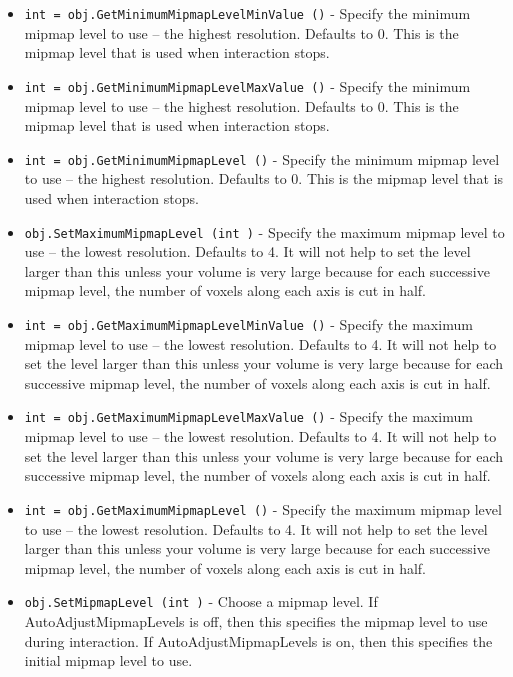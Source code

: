 \begin{itemize}
\item  \verb|int = obj.GetMinimumMipmapLevelMinValue ()| -  Specify the minimum mipmap level to use -- the highest resolution.
 Defaults to 0. This is the mipmap level that is used when interaction
 stops.

\item  \verb|int = obj.GetMinimumMipmapLevelMaxValue ()| -  Specify the minimum mipmap level to use -- the highest resolution.
 Defaults to 0. This is the mipmap level that is used when interaction
 stops.

\item  \verb|int = obj.GetMinimumMipmapLevel ()| -  Specify the minimum mipmap level to use -- the highest resolution.
 Defaults to 0. This is the mipmap level that is used when interaction
 stops.

\item  \verb|obj.SetMaximumMipmapLevel (int )| -  Specify the maximum mipmap level to use -- the lowest resolution.
 Defaults to 4. It will not help to set the level larger than
 this unless your volume is very large because for each successive mipmap
 level, the number of voxels along each axis is cut in half.

\item  \verb|int = obj.GetMaximumMipmapLevelMinValue ()| -  Specify the maximum mipmap level to use -- the lowest resolution.
 Defaults to 4. It will not help to set the level larger than
 this unless your volume is very large because for each successive mipmap
 level, the number of voxels along each axis is cut in half.

\item  \verb|int = obj.GetMaximumMipmapLevelMaxValue ()| -  Specify the maximum mipmap level to use -- the lowest resolution.
 Defaults to 4. It will not help to set the level larger than
 this unless your volume is very large because for each successive mipmap
 level, the number of voxels along each axis is cut in half.

\item  \verb|int = obj.GetMaximumMipmapLevel ()| -  Specify the maximum mipmap level to use -- the lowest resolution.
 Defaults to 4. It will not help to set the level larger than
 this unless your volume is very large because for each successive mipmap
 level, the number of voxels along each axis is cut in half.

\item  \verb|obj.SetMipmapLevel (int )| -  Choose a mipmap level. If AutoAdjustMipmapLevels is off, then this
 specifies the mipmap level to use during interaction. If
 AutoAdjustMipmapLevels is on, then this specifies the initial mipmap
 level to use.


\end{itemize}
